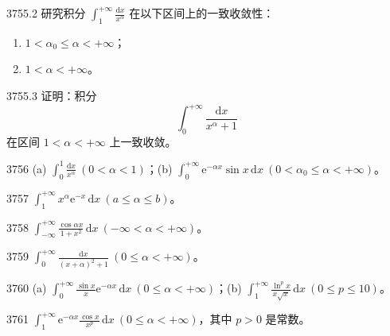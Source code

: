 \begin{prob}[M]{3755.2}
研究积分 $\int_{1}^{+\infty} \frac{\mathrm{d}x}{x^\alpha}$ 在以下区间上的一致收敛性：
\begin{enumerate}[label=(\alph*), itemsep=2pt, topsep=3pt]
  \item $1 < \alpha_0 \leqslant \alpha < +\infty$；
  \item $1 < \alpha < +\infty$。
\end{enumerate}
\end{prob}

\begin{prob}[M]{3755.3}
证明：积分
\[
\int_{0}^{+\infty} \frac{\mathrm{d}x}{x^\alpha + 1}
\]
在区间 $1 < \alpha < +\infty$ 上一致收敛。
\end{prob}


\begin{prob}[M]{3756}
(a) $\int_{0}^{1} \frac{\mathrm{d}x}{x^\alpha} \ (0 < \alpha < 1)$；\qquad (b) $\int_{0}^{+\infty} \mathrm{e}^{-\alpha x}\sin x\,\mathrm{d}x \ (0 < \alpha_0 \leqslant \alpha < +\infty)$。
\end{prob}

\begin{prob}[S]{3757}
$\int_{1}^{+\infty} x^\alpha \mathrm{e}^{-x}\,\mathrm{d}x \ (a \leqslant \alpha \leqslant b)$。
\end{prob}

\begin{prob}[S]{3758}
$\int_{-\infty}^{+\infty} \frac{\cos \alpha x}{1+x^2}\,\mathrm{d}x \ (-\infty < \alpha < +\infty)$。
\end{prob}

\begin{prob}[S]{3759}
$\int_{0}^{+\infty} \frac{\mathrm{d}x}{(x+\alpha)^2 + 1} \ (0 \leqslant \alpha < +\infty)$。
\end{prob}

\begin{prob}[M]{3760}
(a) $\int_{0}^{+\infty} \frac{\sin x}{x} \mathrm{e}^{-\alpha x}\,\mathrm{d}x \ (0 \leqslant \alpha < +\infty)$；\qquad (b) $\int_{1}^{+\infty} \frac{\ln^p x}{x\sqrt{x}}\,\mathrm{d}x \ (0 \leqslant p \leqslant 10)$。
\end{prob}

\begin{prob}[S]{3761}
$\int_{1}^{+\infty} \mathrm{e}^{-\alpha x}\frac{\cos x}{x^p}\,\mathrm{d}x \ (0 \leqslant \alpha < +\infty)$，其中 $p > 0$ 是常数。
\end{prob}

